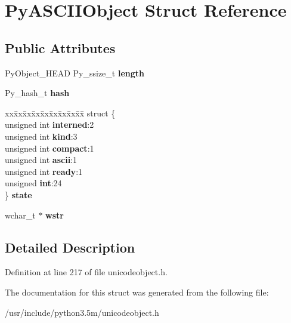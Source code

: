 \hypertarget{structPyASCIIObject}{}\section{Py\+A\+S\+C\+I\+I\+Object Struct Reference}
\label{structPyASCIIObject}
\subsection*{Public Attributes}
\begin{DoxyCompactItemize}
\item 
Py\+Object\+\_\+\+H\+E\+AD Py\+\_\+ssize\+\_\+t {\bfseries length}\hypertarget{structPyASCIIObject_a90c3126af2bd2e05b88baceb267ef75d}{}\label{structPyASCIIObject_a90c3126af2bd2e05b88baceb267ef75d}

\item 
Py\+\_\+hash\+\_\+t {\bfseries hash}\hypertarget{structPyASCIIObject_aea284faaed395618dc316769d1ec371c}{}\label{structPyASCIIObject_aea284faaed395618dc316769d1ec371c}

\item 
\begin{tabbing}
xx\=xx\=xx\=xx\=xx\=xx\=xx\=xx\=xx\=\kill
struct \{\\
\>unsigned int {\bfseries interned}:2\\
\>unsigned int {\bfseries kind}:3\\
\>unsigned int {\bfseries compact}:1\\
\>unsigned int {\bfseries ascii}:1\\
\>unsigned int {\bfseries ready}:1\\
\>unsigned {\bfseries int}:24\\
\} {\bfseries state}\hypertarget{structPyASCIIObject_ac332f13ab4d341b09c99d40bbc5edc12}{}\label{structPyASCIIObject_ac332f13ab4d341b09c99d40bbc5edc12}
\\

\end{tabbing}\item 
wchar\+\_\+t $\ast$ {\bfseries wstr}\hypertarget{structPyASCIIObject_a9774aaad393b1152a6f68597909a128d}{}\label{structPyASCIIObject_a9774aaad393b1152a6f68597909a128d}

\end{DoxyCompactItemize}


\subsection{Detailed Description}


Definition at line 217 of file unicodeobject.\+h.



The documentation for this struct was generated from the following file\+:\begin{DoxyCompactItemize}
\item 
/usr/include/python3.\+5m/unicodeobject.\+h\end{DoxyCompactItemize}

